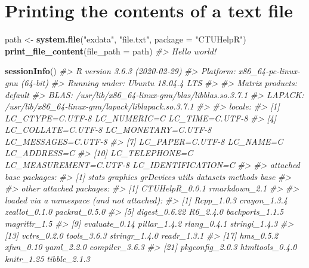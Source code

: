\documentclass[]{article}
\newenvironment{Shaded}{\begin{snugshade}}{\end{snugshade}}
\newcommand{\CommentTok}[1]{\textcolor[rgb]{0.56,0.35,0.01}{\textit{#1}}}
\newcommand{\DataTypeTok}[1]{\textcolor[rgb]{0.13,0.29,0.53}{#1}}
\newcommand{\KeywordTok}[1]{\textcolor[rgb]{0.13,0.29,0.53}{\textbf{#1}}}
\newcommand{\NormalTok}[1]{#1}
\newcommand{\StringTok}[1]{\textcolor[rgb]{0.31,0.60,0.02}{#1}}
\begin{document}
\hypertarget{printing-the-contents-of-a-text-file}{%
\section{Printing the contents of a text
file}\label{printing-the-contents-of-a-text-file}}

\begin{Shaded}
\begin{Highlighting}[]
\NormalTok{path <-}\StringTok{ }\KeywordTok{system.file}\NormalTok{(}\StringTok{"exdata"}\NormalTok{, }\StringTok{"file.txt"}\NormalTok{,}
                    \DataTypeTok{package =} \StringTok{"CTUHelpR"}\NormalTok{)}
\KeywordTok{print_file_content}\NormalTok{(}\DataTypeTok{file_path =}\NormalTok{ path)}
\CommentTok{#> Hello world!}
\end{Highlighting}
\end{Shaded}

\newpage

\begin{Shaded}
\begin{Highlighting}[]
\KeywordTok{sessionInfo}\NormalTok{()}
\CommentTok{#> R version 3.6.3 (2020-02-29)}
\CommentTok{#> Platform: x86_64-pc-linux-gnu (64-bit)}
\CommentTok{#> Running under: Ubuntu 18.04.4 LTS}
\CommentTok{#> }
\CommentTok{#> Matrix products: default}
\CommentTok{#> BLAS:   /usr/lib/x86_64-linux-gnu/blas/libblas.so.3.7.1}
\CommentTok{#> LAPACK: /usr/lib/x86_64-linux-gnu/lapack/liblapack.so.3.7.1}
\CommentTok{#> }
\CommentTok{#> locale:}
\CommentTok{#>  [1] LC_CTYPE=C.UTF-8       LC_NUMERIC=C           LC_TIME=C.UTF-8       }
\CommentTok{#>  [4] LC_COLLATE=C.UTF-8     LC_MONETARY=C.UTF-8    LC_MESSAGES=C.UTF-8   }
\CommentTok{#>  [7] LC_PAPER=C.UTF-8       LC_NAME=C              LC_ADDRESS=C          }
\CommentTok{#> [10] LC_TELEPHONE=C         LC_MEASUREMENT=C.UTF-8 LC_IDENTIFICATION=C   }
\CommentTok{#> }
\CommentTok{#> attached base packages:}
\CommentTok{#> [1] stats     graphics  grDevices utils     datasets  methods   base     }
\CommentTok{#> }
\CommentTok{#> other attached packages:}
\CommentTok{#> [1] CTUHelpR_0.0.1 rmarkdown_2.1 }
\CommentTok{#> }
\CommentTok{#> loaded via a namespace (and not attached):}
\CommentTok{#>  [1] Rcpp_1.0.3      crayon_1.3.4    zeallot_0.1.0   packrat_0.5.0  }
\CommentTok{#>  [5] digest_0.6.22   R6_2.4.0        backports_1.1.5 magrittr_1.5   }
\CommentTok{#>  [9] evaluate_0.14   pillar_1.4.2    rlang_0.4.1     stringi_1.4.3  }
\CommentTok{#> [13] vctrs_0.2.0     tools_3.6.3     stringr_1.4.0   readr_1.3.1    }
\CommentTok{#> [17] hms_0.5.2       xfun_0.10       yaml_2.2.0      compiler_3.6.3 }
\CommentTok{#> [21] pkgconfig_2.0.3 htmltools_0.4.0 knitr_1.25      tibble_2.1.3}
\end{Highlighting}
\end{Shaded}
\end{document}
